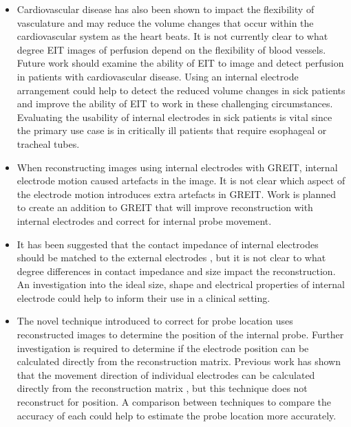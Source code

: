 \begin{itemize}
	\item Cardiovascular disease has also been shown to impact the flexibility of 
	vasculature \parencite{glasser_vascular_1997} and may reduce the volume 
	changes that occur within the cardiovascular system as the heart beats. It is not currently 
	clear to what degree EIT images of perfusion depend on the flexibility of blood vessels. 
	Future work should examine the ability of EIT to image and detect perfusion 
	in patients with cardiovascular disease. Using an internal electrode arrangement 
	could help to detect the reduced volume changes in sick patients and improve the ability 
	of EIT to work in these challenging circumstances. Evaluating the usability of internal 
	electrodes in sick patients is vital since the primary use case is in critically ill patients 
	that require esophageal or tracheal tubes. 

	\item When reconstructing images using internal electrodes with GREIT, 
	internal electrode motion 
	caused artefacts in the image. 
	It is not clear which aspect of the electrode motion introduces extra artefacts in GREIT.
	Work is planned to create an addition to 
	GREIT that will improve reconstruction 
	with internal electrodes and correct for internal probe movement. 

	\item It has been suggested that the contact impedance of internal 
	electrodes should be matched to the
	external electrodes \parencite{nasehi_tehrani_evaluation_2012}, 
	but it is not clear to what degree
	differences in contact impedance and size impact the reconstruction. 
	An investigation into the ideal size, shape and 
	electrical properties of internal electrode 
	could help to inform their use in a clinical setting. 

	\item The novel technique introduced to correct for probe location uses reconstructed images 
	to determine the position of the internal probe. Further investigation is required to determine 
	if the electrode position can be calculated directly from the reconstruction matrix. Previous
	work has shown that 
	the movement direction of individual electrodes can be 
	calculated directly from the reconstruction matrix 
	\parencite{soleimani_imaging_2006}, but this technique does not reconstruct for position. 
	A comparison between techniques to compare the accuracy of each could help to 
	estimate the probe location more accurately.
\end{itemize}

